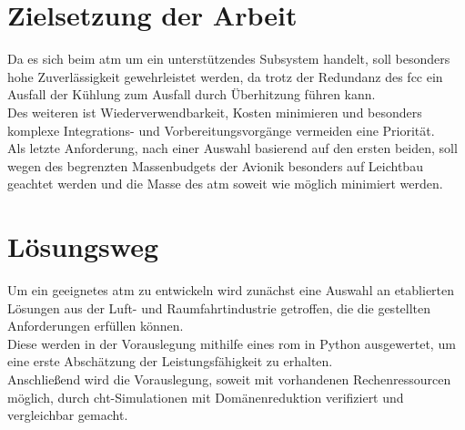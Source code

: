 \section{Zielsetzung der Arbeit}

Da es sich beim \ac{atm} um ein unterstützendes Subsystem handelt, soll besonders hohe Zuverlässigkeit gewehrleistet werden, da trotz der
Redundanz des \ac{fcc} ein Ausfall der Kühlung zum Ausfall durch Überhitzung führen kann.\\
Des weiteren ist Wiederverwendbarkeit, Kosten minimieren und besonders komplexe Integrations- und Vorbereitungsvorgänge
vermeiden eine Priorität.\\
Als letzte Anforderung, nach einer Auswahl basierend auf den ersten beiden, soll wegen des begrenzten Massenbudgets der Avionik
besonders auf Leichtbau geachtet werden und die Masse des \ac{atm} soweit wie möglich minimiert werden.\\

\section{Lösungsweg}

Um ein geeignetes \ac{atm} zu entwickeln wird zunächst eine Auswahl an etablierten Lösungen aus der Luft- und Raumfahrtindustrie
getroffen, die die gestellten Anforderungen erfüllen können.\\

Diese werden in der Vorauslegung mithilfe eines \ac{rom} in Python ausgewertet, um eine erste Abschätzung der Leistungsfähigkeit zu erhalten.\\
Anschließend wird die Vorauslegung, soweit mit vorhandenen Rechenressourcen möglich, durch \ac{cht}-Simulationen mit Domänenreduktion
verifiziert und vergleichbar gemacht.